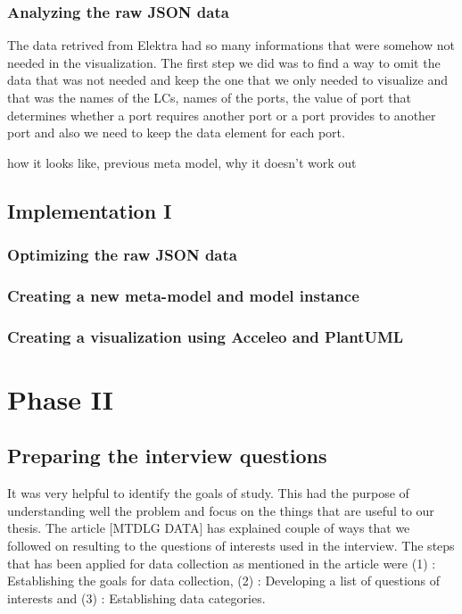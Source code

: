 \subsubsection{Analyzing the raw JSON data}
The data retrived from Elektra had so many informations that were somehow not needed in the visualization. The first step we did was to find a way to omit the data that was not needed and keep the one that we only needed to visualize and that was the names of the LCs, names of the ports, the value of port that determines whether a port requires another port or a port provides to another port and also we need to keep the data element for each port.

how it looks like, previous meta model, why it doesn't work out \todo{[to be filled in]}


\subsection{Implementation I}

\subsubsection{Optimizing the raw JSON data}
\todo{[to be filled in]}

\subsubsection{Creating a new meta-model and model instance}
\todo{[to be filled in]}

\subsubsection{Creating a visualization using Acceleo and PlantUML}
\todo{[to be filled in]}


\section{Phase II}

\subsection{Preparing the interview questions}
It was very helpful to identify the goals of study. This had the purpose of understanding well the problem and focus on the things that are useful to our thesis. The article [MTDLG DATA] has explained couple of ways that we followed on resulting to the questions of interests used in the interview. The steps that has been applied for data collection as mentioned in the article were (1) :  Establishing the goals for data collection, (2) : Developing a list of questions of interests and (3) : Establishing data categories.

